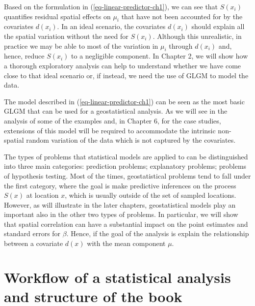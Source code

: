 \documentclass[
  letterpaper,
]{krantz}
\begin{document}
Based on the formulation in (\ref{eq-linear-predictor-ch1}), we can see
that \(S(x_i)\) quantifies residual spatial effects on \(\mu_i\) that
have not been accounted for by the covariates \(d(x_i)\). In an ideal
scenario, the covariates \(d(x_i)\) should explain all the spatial
variation without the need for \(S(x_i)\). Although this unrealistic, in
practice we may be able to most of the variation in \(\mu_i\) through
\(d(x_i)\) and, hence, reduce \(S(x_i)\) to a negligible component. In
Chapter 2, we will show how a thorough exploratory analysis can help to
understand whether we have come close to that ideal scenario or, if
instead, we need the use of GLGM to model the data.

The model described in (\ref{eq-linear-predictor-ch1}) can be seen as
the most basic GLGM that can be used for a geostatistical analysis. As
we will see in the analysis of some of the examples and, in Chapter 6,
for the case studies, extensions of this model will be required to
accommodate the intrinsic non-spatial random variation of the data which
is not captured by the covariates.

The types of problems that statistical models are applied to can be
distinguished into three main categories: prediction problems;
explanatory problems; problems of hypothesis testing. Most of the times,
geostatistical problems tend to fall under the first category, where the
goal is make predictive inferences on the process \(S(x)\) at location
\(x\), which is usually outside of the set of sampled locations.
However, as will illustrate in the later chapters, geostatistical models
play an important also in the other two types of problems. In
particular, we will show that spatial correlation can have a substantial
impact on the point estimates and standard errors for \(\beta\). Hence,
if the goal of the analysis is explain the relationship between a
covariate \(d(x)\) with the mean component \(\mu\).

\hypertarget{workflow-of-a-statistical-analysis-and-structure-of-the-book}{%
\section{Workflow of a statistical analysis and structure of the
book}\label{workflow-of-a-statistical-analysis-and-structure-of-the-book}}
\end{document}
